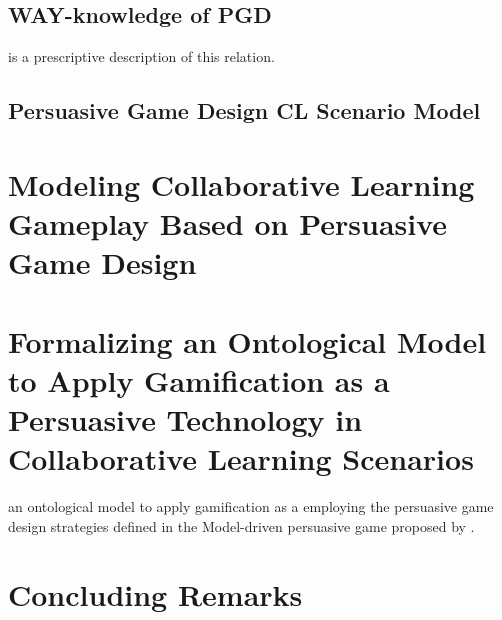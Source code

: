 \newpage
\subsection{WAY-knowledge of PGD}
\label{subsec:way-knowledge-of-persuasive-game-design}

 is a prescriptive description of this relation.

\newpage
\subsection{Persuasive Game Design CL Scenario Model}
\label{subsec:persuasive-game-design-cl-scenario-model}






\section[Modeling CL Gameplay Based on Persuasive Game Design]{Modeling Collaborative Learning Gameplay Based on Persuasive Game Design}
\label{sec:modeling-cl-gameplay-persuasive-game-design}


\section[Formalizing an Ontological Model to Apply Gamification as a Persuasive Technology in CL Scenarios]{Formalizing an Ontological Model to Apply Gamification as a Persuasive Technology in Collaborative Learning Scenarios}
\label{sec:formalizing-ontological-model-apply-gamification-persuasive-technology}



 an ontological model to apply gamification as a  employing the persuasive game design strategies defined in the Model-driven persuasive game proposed by .
 
 
\section{Concluding Remarks}
\label{sec:ontogacles2-concluding-remarks} 

 
